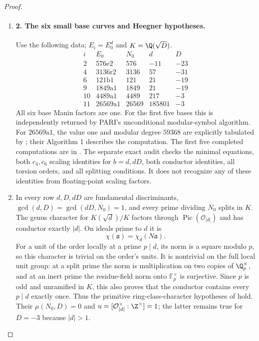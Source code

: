 \begin{proof}
\begin{enumerate}[label=\arabic*.,leftmargin=*]
\item \paragraph{2. The six small base curves and Heegner hypotheses.}
Use the following data; $E_i=E_0^d$ and $K=\Q(\sqrt D)$.
\[
\begin{array}{c|c|r|r|r}
 i&E_0&N_0&d&D\\\hline
 2&576\mathrm e2&576&-11&-23\\
 4&3136\mathrm r2&3136&57&-31\\
 6&121\mathrm b1&121&21&-19\\
 9&1849\mathrm a1&1849&21&-19\\
 10&4489\mathrm a1&4489&217&-3\\
 11&26569\mathrm a1&26569&185801&-3
\end{array}
\]
All six base Manin factors are one. For the first five bases this
is independently returned by PARI's unconditional modular-symbol
algorithm. For $26569\mathrm a1$, the value one and modular degree
$59368$ are explicitly tabulated by
\citet[Appendix B, p.~102, unnumbered $26569\mathrm a1/26569\mathrm a2$
block]{CgzBelabas2019}; their Algorithm 1 describes the computation.
The first five completed computations are in
. The separate exact audit
 checks the minimal equations,
both $c_4,c_6$ scaling identities for $b=d,dD$, both conductor
identities, all torsion orders, and all splitting conditions. It
does not recognize any of these identities from floating-point
scaling factors.

\item In every row $d,D,dD$ are fundamental discriminants,
$\gcd(d,D)=\gcd(dD,N_0)=1$, and every prime dividing $N_0$ splits
in $K$. The genus character for $K(\sqrt d)/K$ factors through
$\operatorname{Pic}(\mathcal O_{|d|})$ and has conductor exactly
$|d|$. On ideals prime to $d$ it is
\[
 \chi(\mathfrak a)=\chi_d(N\mathfrak a).
\]
For a unit of the order locally at a prime $p\mid d$, its norm is
a square modulo $p$, so this character is trivial on the order's
units. It is nontrivial on the full local unit group: at a split
prime the norm is multiplication on two copies of $\Q_p^\times$,
and at an inert prime the residue-field norm onto $\mathbb F_p^\times$
is surjective. Since $p$ is odd and unramified in $K$, this also
proves that the conductor contains every $p\mid d$ exactly once.
Thus the primitive ring-class-character hypotheses of
\citet[Theorem 1.1, pp.~2524--2525]{CgzCai2014} hold. Their
$\mu(N_0,D)=0$ and
$u=[\mathcal O_{|d|}^{\times}:\Z^{\times}]=1$; the latter remains
true for $D=-3$ because $|d|>1$.


\end{enumerate}
\end{proof}

